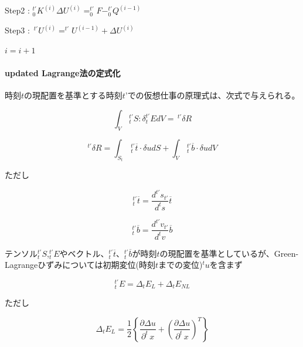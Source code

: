 \documentclass[a4paper,pandoc,ja=standard]{bxjsarticle}
\let\oldparagraph\paragraph
\renewcommand{\paragraph}[1]{\oldparagraph{#1}\mbox{}}
\begin{document}
Step2 :
\(^{t'}_0 K^{(i)}\Delta U^{(i)}=^{t'}_0 F-^{t'}_0 Q^{(i-1)}\)

Step3 :
\(\,^{t'} U^{(i)}=^{t'} U^{(i-1)} + \Delta U^{(i)}\)

\(i=i+1\)

\hypertarget{updated-lagrangeux6cd5ux306eux5b9aux5f0fux5316}{%
\paragraph{updated Lagrange法の定式化}\label{updated-lagrangeux6cd5ux306eux5b9aux5f0fux5316}}

時刻\(t\)の現配置を基準とする時刻\(t’\)での仮想仕事の原理式は、次式で与えられる。

\begin{equation}
\int_{V}\,^{t'}_{t} S:\delta_t^{t'}
E dV=\,^{t'}\delta R
\label{eq:2.2.21}
\end{equation}

\begin{equation}
^{t'}\delta R = \int_{S_t}\,^{t'}_t\overline{t} \cdot \delta u dS + \int_{V}\,^{t'}_t\overline{b} \cdot \delta u dV
\label{eq:2.2.22}
\end{equation}

ただし

\begin{equation}
^{t'}_{t} \overline{t} = \frac{d^{t'}s_{t'}}{d^ts}\overline{t}
\label{eq:2.2.23}
\end{equation}

\begin{equation}
^{t'}_{t} \overline{b} = \frac{d^{t'}v_{t'}}{d^tv}\overline{b}
\label{eq:2.2.24}
\end{equation}

テンソル\(^{t'}_{t} S\),\(^{t'}_{t} E\)やベクトル、\(^{t'}_t\overline{t}\)、\(^{t'}_t\overline{b}\)が時刻\(t\)の現配置を基準としているが、Green-Lagrangeひずみについては初期変位(時刻\(t\)までの変位)\(^t u\)を含まず

\begin{equation}
^{t'}_{t} E = \Delta_{t} E_{L} + \Delta_{t} E_{NL}
\label{eq:2.2.25}
\end{equation}

ただし

\begin{equation}
\Delta_{t} E_{L}=\frac{1}{2}
\left\lbrace \frac{\partial \Delta u}{\partial^t\, x} + \left(\frac{ \partial \Delta u}{\partial ^t\,x}\right)^T \right\rbrace
\label{eq:2.2.26}
\end{equation}
\end{document}

